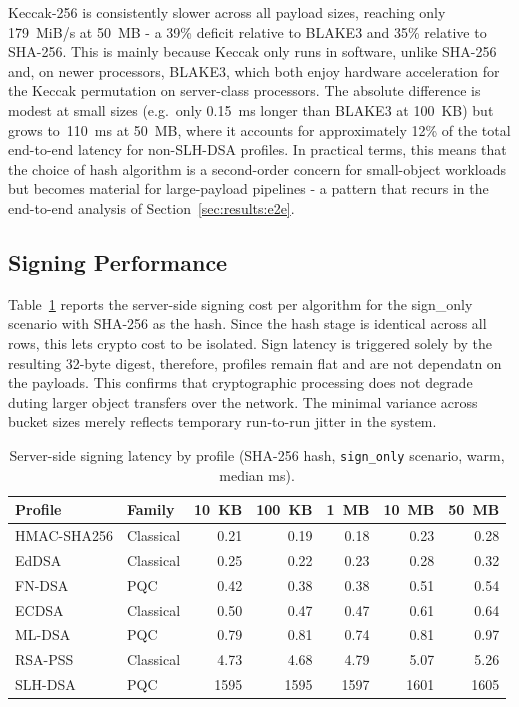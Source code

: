 \documentclass[12pt,a4paper]{article}
\begin{document}
Keccak-256 is consistently slower across all payload sizes, reaching only 179~MiB/s at 50~MB - a 39\% deficit relative to BLAKE3 and 35\% relative to SHA-256. This is mainly because Keccak only runs in software, unlike SHA-256 and, on newer processors, BLAKE3, which both enjoy hardware acceleration for the Keccak permutation on server-class processors. The absolute difference is modest at small sizes (e.g.\ only 0.15~ms longer than BLAKE3 at 100~KB) but grows to~110~ms at 50~MB, where it accounts for approximately 12\% of the total end-to-end latency for non-SLH-DSA profiles. In practical terms, this means that the choice of hash algorithm is a second-order concern for small-object workloads but becomes material for large-payload pipelines - a pattern that recurs in the end-to-end analysis of Section~\ref{sec:results:e2e}.

\subsection{Signing Performance}
\label{sec:results:sign}

Table~\ref{tab:sign_latency} reports the server-side signing cost per algorithm for the sign\_only scenario with SHA-256 as the hash. Since the hash stage is identical across all rows, this lets crypto cost to be isolated. Sign latency is triggered solely by the resulting 32-byte digest, therefore, profiles remain flat and are not dependatn on the payloads. This confirms that cryptographic processing does not degrade duting larger object transfers over the network. The minimal variance across bucket sizes merely reflects temporary run-to-run jitter in the system.

\begin{table}[H]
\centering
\caption[Server-side signing latency by profile]{Server-side signing latency by profile (SHA-256 hash,
         \texttt{sign\_only} scenario, warm, median ms).}
\label{tab:sign_latency}
\begin{tabular}{l l rrrrr}
\toprule
Profile & Family & 10~KB & 100~KB & 1~MB & 10~MB & 50~MB \\
\midrule
HMAC-SHA256 & Classical & 0.21 & 0.19 & 0.18 & 0.23 & 0.28 \\
EdDSA       & Classical & 0.25 & 0.22 & 0.23 & 0.28 & 0.32 \\
FN-DSA      & PQC       & 0.42 & 0.38 & 0.38 & 0.51 & 0.54 \\
ECDSA       & Classical & 0.50 & 0.47 & 0.47 & 0.61 & 0.64 \\
ML-DSA      & PQC       & 0.79 & 0.81 & 0.74 & 0.81 & 0.97 \\
RSA-PSS     & Classical & 4.73 & 4.68 & 4.79 & 5.07 & 5.26 \\
SLH-DSA     & PQC       & 1595 & 1595 & 1597 & 1601 & 1605 \\
\bottomrule
\end{tabular}
\end{table}
\end{document}
